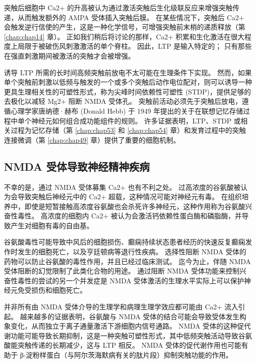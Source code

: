 突触后细胞中 Ca2+ 的升高被认为通过激活突触后生化级联反应来增强突触传递，从而触发额外的 AMPA 受体插入突触后膜。 
在某些情况下，突触后 Ca2+ 会触发逆行信使的产生，这是一种化学信号，可增强突触前末梢的递质释放（第 \ref{chap:chap14} 章）。
正如我们稍后将讨论的那样，Ca2+ 积累和生化激活在很大程度上局限于被破伤风刺激激活的单个脊柱。 因此，LTP 是输入特定的； 
只有那些在强直刺激期间被激活的突触才会被增强。


诱导 LTP 所需的长时间高频突触前放电不太可能在生理条件下实现。 
然而，如果单个突触前刺激以低频与触发的一个或多个突触后动作电位配对，则可以诱导一种更具生理相关性的可塑性形式，称为尖峰时间依赖性可塑性 (STDP)，提供足够的去极化以减轻 Mg2+ 阻断 NMDA 受体孔。 
突触前活动必须先于突触后放电，遵循心理学家唐纳德·赫布 (Donald Hebb) 于 1949 年提出的关于在联想记忆存储过程中单个神经元如何组合成功能组件的规则。 许多证据表明，LTP、STDP 或相关过程为记忆存储（第 \ref{chap:chap53} 和 \ref{chap:chap54} 章）和发育过程中的突触连接微调（第 \ref{chap:chap49} 章）提供了重要的细胞机制。



\subsection{NMDA 受体导致神经精神疾病}

不幸的是，通过 NMDA 受体募集 Ca2+ 也有不利之处。 过高浓度的谷氨酸被认为会导致突触后神经元中的 Ca2+ 超载，这种情况可能对神经元有毒。
在组织培养中，即使是短暂接触高浓度谷氨酸也会杀死许多神经元，这种作用称为谷氨酸兴奋性毒性。 
高浓度的细胞内 Ca2+ 被认为会激活钙依赖性蛋白酶和磷脂酶，并导致产生对细胞有毒的自由基。


谷氨酸毒性可能导致中风后的细胞损伤、癫痫持续状态患者经历的快速反复癫痫发作时发生的细胞死亡，以及亨廷顿病等退行性疾病。 
选择性阻断 NMDA 受体的药物可以防止谷氨酸的毒性作用，并且已经过临床测试。 
迄今为止，伴随 NMDA 受体阻断的幻觉限制了此类化合物的用途。 
通过阻断 NMDA 受体功能来控制兴奋性毒性的尝试的另一个并发症是 NMDA 受体激活的生理水平实际上可以保护神经元免受损伤和细胞死亡。


并非所有由 NMDA 受体介导的生理学和病理生理学效应都可能由 Ca2+ 流入引起。 
越来越多的证据表明，谷氨酸与 NMDA 受体的结合可能会导致受体发生构象变化，从而独立于离子通量激活下游细胞内信号通路。 
NMDA 受体的这种促代谢功能可能导致长期抑制，这是一种突触可塑性形式，其中低频突触活动导致谷氨酸能突触传递的长期减少，这与 LTP 相反。 
NMDA 受体的促代谢作用也可能有助于 β-淀粉样蛋白（与阿尔茨海默病有关的肽片段）抑制突触功能的作用。


